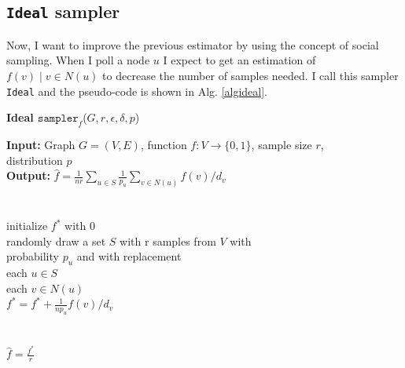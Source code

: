 \subsection{\texttt{Ideal} sampler}
\label{algorithmideal}
Now, I want to improve the previous estimator by using the concept of social sampling. When I poll a node $u$ I expect to get an estimation of ${f(v)\;|\;v \in N(u)}$ to decrease the number of samples needed.
I call this sampler \texttt{Ideal}\cite{dasgupta2012social} and the pseudo-code is shown in Alg. \ref{algideal}.
\begin{algorithm*}[!htb]
\caption{\small {\bf Ideal $\texttt{sampler}_f$}($G, r, \epsilon, \delta, p$)}
\begin{code}
{\bf Input:} Graph $G=(V,E)$, function $f : V \rightarrow \{0,1\}$, sample size $r$,\\ distribution $p$ \\
{\bf Output:} $\hat{f}=\frac{1}{nr}\sum\nolimits_{u\in S}\frac{1}{p_u}\sum\nolimits_{v\in N(u)} f(v)/d_v$\\
\\
\uln \>\ubegin\\
\uln \>\>initialize $f^*$ with 0 \\
\uln \>\>randomly draw a set $S$ with r samples from $V$ with\\
\>   \>\>\>probability $p_u$ and with replacement\\
\uln \>\>\ufor each $u \in S$ \udo\\
\uln \>\>\>\ufor each $v \in N(u)$ \udo\\
\uln \>\>\>\>$f^* = f^* + \frac{1}{n p_u}f(v)/d_v$ \\
\uln \>\>\>\uend\\
\uln \>\>\uend\\
\uln \>\ureturn $\hat{f} = \frac{f^*}{r}$ \\
\uln \>\uend\\ 
\end{code}
\label{algideal}
\end{algorithm*}

